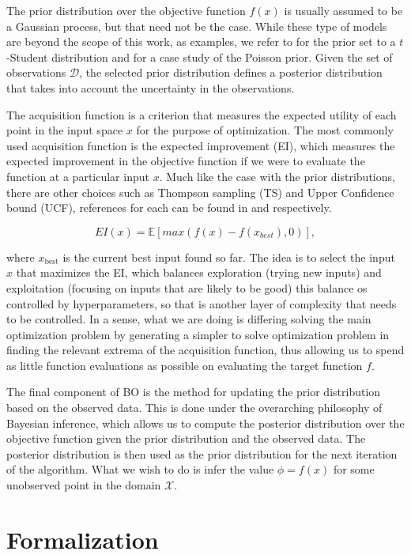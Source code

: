 The prior distribution over the objective function $f(x)$ is usually assumed to be a Gaussian process, but that need not be the case. While these type of models are beyond the scope of this work, as examples, we refer to \cite{shah2013bayesian} for the prior set to a $t$-Student distribution and \cite{wangpoisson} for a case study of the Poisson prior. Given the set of observations $\mathcal{D}$, the selected prior distribution defines a posterior distribution that takes into account the uncertainty in the observations.

The acquisition function is a criterion that measures the expected utility of each point in the input space $x$ for the purpose of optimization. The most commonly used acquisition function is the expected improvement (EI), which measures the expected improvement in the objective function if we were to evaluate the function at a particular input $x$. Much like the case with the prior distributions, there are other choices such as Thompson sampling (TS) and Upper Confidence bound (UCF), references for each can be found in  \cite{kaufmann2012thompson} and \cite{kaufmann2012bayesian} respectively. 

\[ EI(x) = \mathbb{E}[max(f(x) - f(x_{best}), 0)], \]

where $x_{\text{best}}$ is the current best input found so far. The idea is to select the input $x$ that maximizes the EI, which balances exploration (trying new inputs) and exploitation (focusing on inputs that are likely to be good) this balance os controlled by hyperparameters, so that is another layer of complexity that needs to be controlled. In a sense, what we are doing is differing solving the main optimization problem by generating a simpler to solve optimization problem in finding the relevant extrema of the acquisition function, thus allowing us to spend as little function evaluations as possible on evaluating the target function $f$. 

The final component of BO is the method for updating the prior distribution based on the observed data. This is done under the overarching philosophy of Bayesian inference, which allows us to compute the posterior distribution over the objective function given the prior distribution and the observed data. The posterior distribution is then used as the prior distribution for the next iteration of the algorithm. What we wish to do is infer the value $\phi = f(x)$ for some unobserved point in the domain $\mathcal{X}$. 

\section{Formalization}


